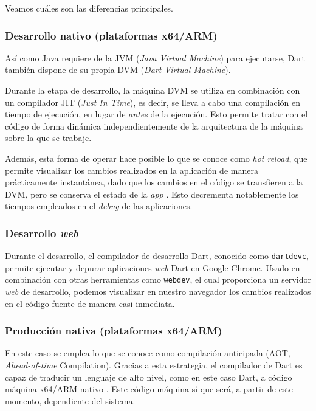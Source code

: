 Veamos cuáles son las diferencias principales.

\subsubsection{Desarrollo nativo (plataformas x64/ARM)}

Así como Java requiere de la JVM (\emph{Java Virtual Machine}) para ejecutarse, Dart también dispone de su propia DVM (\emph{Dart Virtual Machine}).

Durante la etapa de desarrollo, la máquina DVM se utiliza en combinación con un compilador JIT (\emph{Just In Time}), es decir, se lleva a cabo una compilación en tiempo de ejecución, en lugar de \emph{antes} de la ejecución. Esto permite tratar con el código de forma dinámica independientemente de la arquitectura de la máquina sobre la que se trabaje.

Además, esta forma de operar hace posible lo que se conoce como \emph{hot reload}, que permite visualizar los cambios realizados en la aplicación de manera prácticamente instantánea, dado que los cambios en el código se transfieren a la DVM, pero se conserva el estado de la \emph{app} \cite{flutter-hot-reload}. Esto decrementa notablemente los tiempos empleados en el \emph{debug} de las aplicaciones.


\subsubsection{Desarrollo \emph{web}}

Durante el desarrollo, el compilador de desarrollo Dart, conocido como \texttt{dartdevc}, permite ejecutar y depurar aplicaciones \emph{web} Dart en Google Chrome. Usado en combinación con otras herramientas como \texttt{webdev}, el cual proporciona un servidor \emph{web} de desarrollo, podemos visualizar en nuestro navegador los cambios realizados en el código fuente de manera casi inmediata.


\subsubsection{Producción nativa (plataformas x64/ARM)}

En este caso se emplea lo que se conoce como compilación anticipada (AOT, \emph{Ahead-of-time} Compilation). Gracias a esta estrategia, el compilador de Dart es capaz de traducir un lenguaje de alto nivel, como en este caso Dart, a código máquina x64/ARM nativo \cite{aot-wiki}. Este código máquina sí que será, a partir de este momento, dependiente del sistema.

